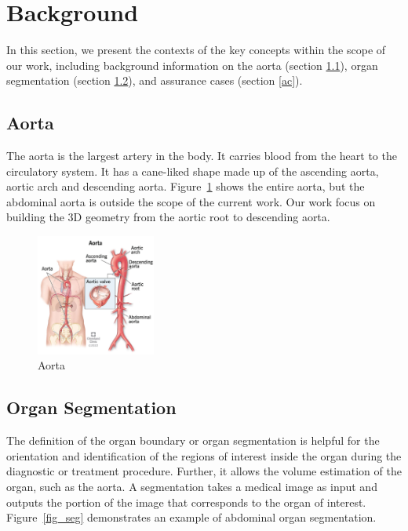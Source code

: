 \section{Background} \label{bg}

In this section, we present the contexts of the key concepts within the scope of our work, including background information on the aorta (section \ref{aorta}), organ segmentation (section \ref{organ_seg}), and assurance cases (section \ref{ac}).

\subsection{Aorta}\label{aorta}
The aorta is the largest artery in the body. It carries blood from the heart to the circulatory system. It has a cane-liked shape made up of the ascending aorta, aortic arch and descending aorta. Figure~\ref{fig_aorta} shows the entire aorta, but the abdominal aorta is outside the scope of the current work. Our work focus on building the 3D geometry from the aortic root to descending aorta.

\begin{figure}[ht]
    \centering
    \includegraphics[width=0.35\textwidth]{figures/Intro/Aorta.png}
    \caption[Aorta]{Aorta \cite{Cleveland_Clinic_medical_professional_2021}}
    \label{fig_aorta}
\end{figure}

\subsection{Organ Segmentation}\label{organ_seg}
The definition of the organ boundary or organ segmentation is helpful for the orientation and identification of the regions of interest inside the organ during the diagnostic or treatment procedure. Further, it allows the volume estimation of the organ, such as the aorta. A segmentation takes a medical image as input and outputs the portion of the image that corresponds to the organ of interest. Figure~\ref{fig_seg} demonstrates an example of abdominal organ segmentation.

